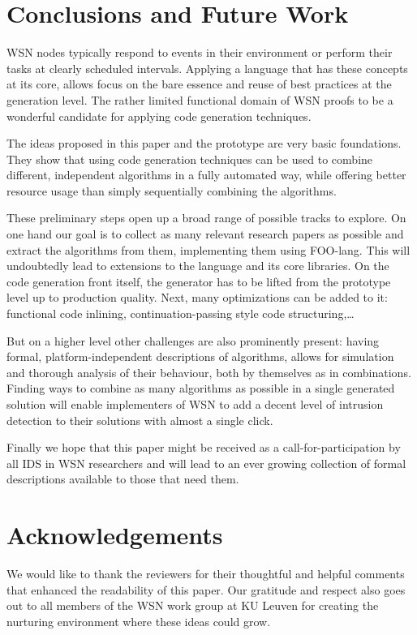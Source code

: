 \documentclass[conference]{IEEEtran}
\begin{document}
\section{Conclusions and Future Work}
\label{section:conclusions}

WSN nodes typically respond to events in their environment or perform their
tasks at clearly scheduled intervals. Applying a language that has these
concepts at its core, allows focus on the bare essence and reuse of best
practices at the generation level. The rather limited functional domain of WSN
proofs to be a wonderful candidate for applying code generation techniques.

The ideas proposed in this paper and the prototype are very basic foundations.
They show that using code generation techniques can be used to combine
different, independent algorithms in a fully automated way, while offering
better resource usage than simply sequentially combining the algorithms.

These preliminary steps open up a broad range of possible tracks to explore. On
one hand our goal is to collect as many relevant research papers as possible
and extract the algorithms from them, implementing them using FOO-lang. This
will undoubtedly lead to extensions to the language and its core libraries. On
the code generation front itself, the generator has to be lifted from the
prototype level up to production quality. Next, many optimizations can be added
to it: functional code inlining, continuation-passing style code
structuring,\dots

But on a higher level other challenges are also prominently present: having
formal, platform-independent descriptions of algorithms, allows for simulation
and thorough analysis of their behaviour, both by themselves as in
combinations. Finding ways to combine as many algorithms as possible in a
single generated solution will enable implementers of WSN to add a decent level
of intrusion detection to their solutions with almost a single click.

Finally we hope that this paper might be received as a call-for-participation
by all IDS in WSN researchers and will lead to an ever growing collection of
formal descriptions available to those that need them.

\section*{Acknowledgements}
\label{section:acknowledgements}

We would like to thank the reviewers for their thoughtful and helpful comments
that enhanced the readability of this paper. Our gratitude and respect also
goes out to all members of the WSN work group at KU Leuven for creating the
nurturing environment where these ideas could grow.



\end{document}
